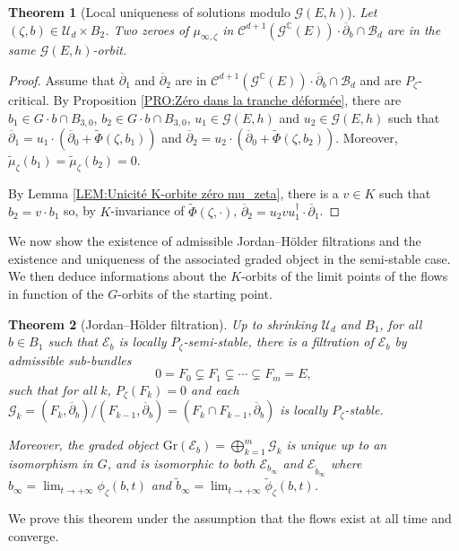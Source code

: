 \documentclass{article}
\newtheorem{theorem}{Theorem}[section]
\theoremstyle{remark}
\theoremstyle{definition}
\newcommand{\C}{\mathbb{C}}
\newcommand{\E}{\mathcal{E}}
\newcommand{\G}{\mathcal{G}}
\newcommand{\mB}{\mathcal{B}}
\newcommand{\mC}{\mathcal{C}}
\newcommand{\mU}{\mathcal{U}}
\newcommand{\dbar}{\overline{\partial}}
\begin{document}
\begin{theorem}[Local uniqueness of solutions modulo $\G(E,h)$]\label{THE:Unicité solutions}
    Let $(\zeta,b) \in \mU_d \times B_2$. Two zeroes of $\mu_{\infty,\zeta}$ in $\mC^{d + 1}(\G^\C(E)) \cdot \dbar_b \cap \mB_d$ are in the same $\G(E,h)$-orbit.
\end{theorem}
\begin{proof}
Assume that $\dbar_1$ and $\dbar_2$ are in $\mC^{d + 1}(\G^\C(E)) \cdot \dbar_b \cap \mB_d$ and are $P_\zeta$-critical. By Proposition \ref{PRO:Zéro dans la tranche déformée}, there are $b_1 \in G \cdot b \cap B_{3,0}$, $b_2 \in G \cdot b \cap B_{3,0}$, $u_1 \in \G(E,h)$ and $u_2 \in \G(E,h)$ such that $\dbar_1 = u_1 \cdot (\dbar_0 + \tilde{\Phi}(\zeta,b_1))$ and $\dbar_2 = u_2 \cdot (\dbar_0 + \tilde{\Phi}(\zeta,b_2))$. Moreover, $\tilde{\mu}_\zeta(b_1) = \tilde{\mu}_\zeta(b_2) = 0$.

By Lemma \ref{LEM:Unicité K-orbite zéro mu_zeta}, there is a $v \in K$ such that $b_2 = v \cdot b_1$ so, by $K$-invariance of $\tilde{\Phi}(\zeta,\cdot)$, $\dbar_2 = u_2vu_1^\dagger \cdot \dbar_1$.
\end{proof}

We now show the existence of admissible Jordan--Hölder filtrations and the existence and uniqueness of the associated graded object in the semi-stable case. We then deduce informations about the $K$-orbits of the limit points of the flows in function of the $G$-orbits of the starting point.

\begin{theorem}[Jordan--Hölder filtration]\label{THE:FJH admissible}
    Up to shrinking $\mU_d$ and $B_1$, for all $b \in B_1$ such that $\E_b$ is locally $P_\zeta$-semi-stable, there is a filtration of $\E_b$ by admissible sub-bundles
    $$
    0 = F_0 \subsetneq F_1 \subsetneq \cdots \subsetneq F_m = E,
    $$
    such that for all $k$, $P_\zeta(F_k) = 0$ and each $\G_k = (F_k,\dbar_b)/(F_{k - 1},\dbar_b) = (F_k \cap F_{k - 1},\dbar_b)$ is locally $P_\zeta$-stable.
    
    Moreover, the graded object $\mathrm{Gr}(\E_b) = \bigoplus_{k = 1}^m \G_k$ is unique up to an isomorphism in $G$, and is isomorphic to both $\E_{b_\infty}$ and $\E_{\tilde{b}_\infty}$ where $b_\infty = \lim_{t \rightarrow +\infty} \phi_\zeta(b,t)$ and $\tilde{b}_\infty = \lim_{t \rightarrow +\infty} \tilde{\phi}_\zeta(b,t)$.
\end{theorem}

We prove this theorem under the assumption that the flows exist at all time and converge.
\end{document}
